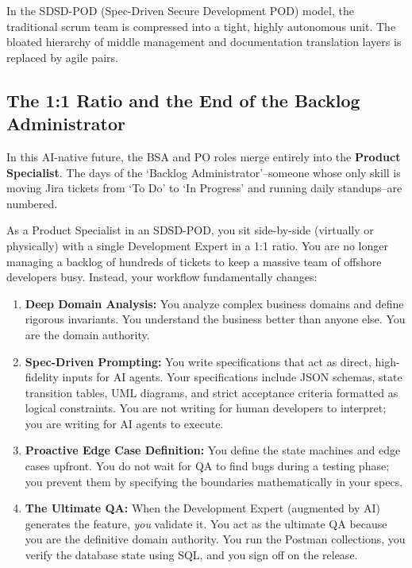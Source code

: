 \documentclass[
  11pt,
  openany,
  oneside]{book}
\providecommand{\tightlist}{%
  \setlength{\itemsep}{0pt}\setlength{\parskip}{0pt}}
\begin{document}
In the SDSD-POD (Spec-Driven Secure Development POD) model, the
traditional scrum team is compressed into a tight, highly autonomous
unit. The bloated hierarchy of middle management and documentation
translation layers is replaced by agile pairs.

\subsection{The 1:1 Ratio and the End of the Backlog
Administrator}\label{the-11-ratio-and-the-end-of-the-backlog-administrator}

In this AI-native future, the BSA and PO roles merge entirely into the
\textbf{Product Specialist}. The days of the `Backlog
Administrator'--someone whose only skill is moving Jira tickets from `To
Do' to `In Progress' and running daily standups--are numbered.

As a Product Specialist in an SDSD-POD, you sit side-by-side (virtually
or physically) with a single Development Expert in a 1:1 ratio. You are
no longer managing a backlog of hundreds of tickets to keep a massive
team of offshore developers busy. Instead, your workflow fundamentally
changes:

\begin{enumerate}
\def\labelenumi{\arabic{enumi}.}
\tightlist
\item
  \textbf{Deep Domain Analysis:} You analyze complex business domains
  and define rigorous invariants. You understand the business better
  than anyone else. You are the domain authority.
\item
  \textbf{Spec-Driven Prompting:} You write specifications that act as
  direct, high-fidelity inputs for AI agents. Your specifications
  include JSON schemas, state transition tables, UML diagrams, and
  strict acceptance criteria formatted as logical constraints. You are
  not writing for human developers to interpret; you are writing for AI
  agents to execute.
\item
  \textbf{Proactive Edge Case Definition:} You define the state machines
  and edge cases upfront. You do not wait for QA to find bugs during a
  testing phase; you prevent them by specifying the boundaries
  mathematically in your specs.
\item
  \textbf{The Ultimate QA:} When the Development Expert (augmented by
  AI) generates the feature, \emph{you} validate it. You act as the
  ultimate QA because you are the definitive domain authority. You run
  the Postman collections, you verify the database state using SQL, and
  you sign off on the release.
\end{enumerate}
\end{document}
